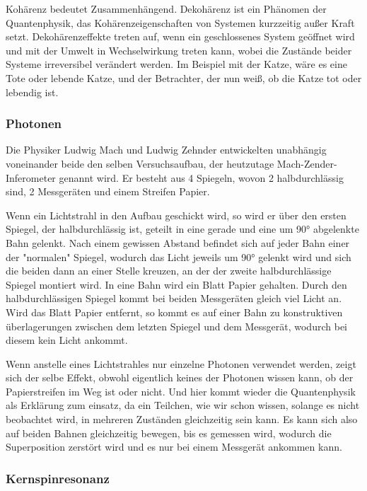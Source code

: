 Koh\"arenz bedeutet Zusammenh\"angend. Dekoh\"arenz ist ein Ph\"anomen der Quantenphysik, das Koh\"arenzeigenschaften von Systemen kurzzeitig außer Kraft setzt. Dekoh\"arenzeffekte treten auf, wenn ein geschlossenes System ge\"offnet wird und mit der Umwelt in Wechselwirkung treten kann, wobei die Zust\"ande beider Systeme irreversibel ver\"andert werden.
Im Beispiel mit der Katze, w\"are es eine Tote oder lebende Katze, und der Betrachter, der nun weiß, ob die Katze tot oder lebendig ist.

\subsubsection{Photonen}

Die Physiker Ludwig Mach und Ludwig Zehnder entwickelten unabh\"angig voneinander beide den selben Versuchsaufbau, der heutzutage Mach-Zender-Inferometer genannt wird. Er besteht aus 4 Spiegeln, wovon 2 halbdurchl\"assig sind, 2 Messger\"aten und einem Streifen Papier.

Wenn ein Lichtstrahl in den Aufbau geschickt wird, so wird er \"uber den ersten Spiegel, der halbdurchl\"assig ist, geteilt in eine gerade und eine um 90° abgelenkte Bahn gelenkt. Nach einem gewissen Abstand befindet sich auf jeder Bahn einer der "normalen" Spiegel, wodurch das Licht jeweils um 90° gelenkt wird und sich die beiden dann an einer Stelle kreuzen, an der der zweite halbdurchl\"assige Spiegel montiert wird. In eine Bahn wird ein Blatt Papier gehalten. Durch den halbdurchl\"assigen Spiegel kommt bei beiden Messger\"aten gleich viel Licht an. Wird das Blatt Papier entfernt, so kommt es auf einer Bahn zu konstruktiven \"uberlagerungen zwischen dem letzten Spiegel und dem Messger\"at, wodurch bei diesem kein Licht ankommt.

Wenn anstelle eines Lichtstrahles nur einzelne Photonen verwendet werden, zeigt sich der selbe Effekt, obwohl eigentlich keines der Photonen wissen kann, ob der Papierstreifen im Weg ist oder nicht. Und hier kommt wieder die Quantenphysik als Erkl\"arung zum einsatz, da ein Teilchen, wie wir schon wissen, solange es nicht beobachtet wird, in mehreren Zust\"anden gleichzeitig sein kann. Es kann sich also auf beiden Bahnen gleichzeitig bewegen, bis es gemessen wird, wodurch die Superposition zerst\"ort wird und es nur bei einem Messger\"at ankommen kann.

\subsubsection{Kernspinresonanz}

